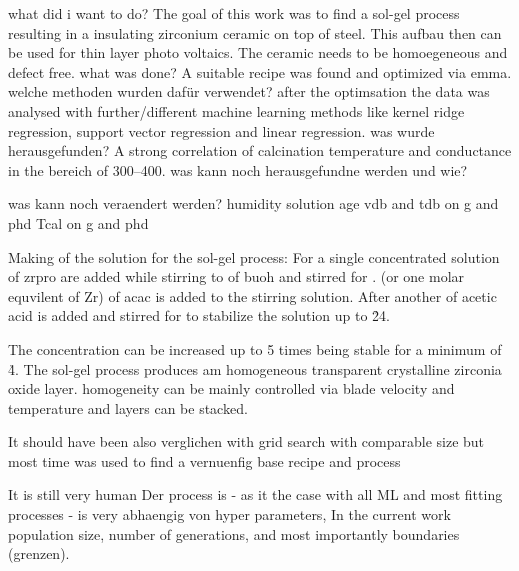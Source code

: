 what did i want to do? 
The goal of this work was to find a sol-gel process resulting in a insulating zirconium ceramic on top of steel.
This aufbau then can be used for thin layer photo voltaics. 
The ceramic needs to be homoegeneous and defect free. 
what was done? 
A suitable recipe was found and optimized via \gls{emma}. 
welche methoden wurden dafür verwendet? 
after the optimsation the data was analysed with further/different machine learning methods like kernel ridge regression, support vector regression and linear regression. 
was wurde herausgefunden? 
A strong correlation of calcination temperature and conductance in the bereich of 300--400\oc{}. 
was kann noch herausgefundne werden und wie? 

was kann noch veraendert werden? 
humidity 
solution age
vdb and tdb on g and phd 
Tcal on g and phd 



Making of the solution for the sol-gel process:
For a single concentrated solution  of \gls{zrpro} are added while stirring to  of \gls{buoh} and stirred for . 
 (or one molar equvilent of Zr) of \gls{acac} is added to the stirring solution. 
After another   of acetic acid is added and stirred for  to stabilize the solution up to \h{24}. 

The concentration can be increased up to 5 times being stable for a minimum of \h{4}. 
The sol-gel process produces am homogeneous transparent crystalline zirconia oxide layer. 
homogeneity can be mainly controlled via blade velocity and temperature and layers can be stacked.

It should have been also verglichen with grid search with comparable size
but most time was used to find a vernuenfig base recipe and process

It is still very human 
Der process is - as it the case with all ML and most fitting processes - is very abhaengig von hyper parameters, 
In the current work population size, number of generations, and most importantly boundaries (grenzen). 
